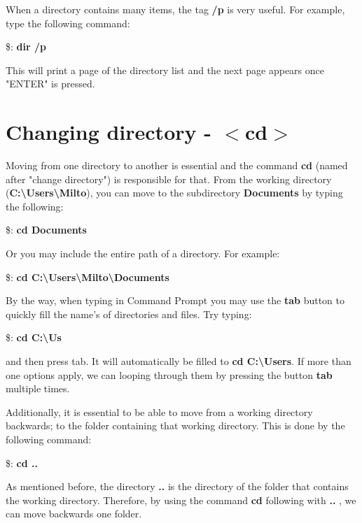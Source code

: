 \documentclass{article}
\begin{document}
	\par When a directory contains many items, the tag \textbf{/p} is very useful. For example, type the following command:
	\par\$:\textbf{ dir /p }
	
	\par This will print a page of the directory list and the next page appears once "ENTER" is pressed. 
	
		
	\section{Changing directory - $<$cd$>$}
	\par Moving from one directory to another is essential and the command \textbf{cd} (named after "change directory") is responsible for that. From the working directory (\textbf{C:\textbackslash Users\textbackslash Milto}), you can move to the subdirectory \textbf{Documents} by typing the following: 
	\par \$: \textbf{cd Documents}  
	
	\par Or you may include the entire path of a directory. For example:
	
	\par \$: \textbf{cd C:\textbackslash Users\textbackslash Milto\textbackslash Documents}  
	
	
	\par By the way, when typing in Command Prompt you may use the \textbf{tab} button to quickly fill the name's of directories and files. Try typing:
	
	\par \$: \textbf{cd C:\textbackslash Us}
	
	\par and then press tab. It will automatically be filled to \textbf{cd C:\textbackslash Users}. If more than one options apply, we can looping through them by pressing the button \textbf{tab} multiple times. 
	
	\par Additionally, it is essential to be able to move from a working directory backwards; to the folder containing that working directory. This is done by the following command:
	
	\par \$: \textbf{cd ..}
	
	\par As mentioned before, the directory \textbf{..} is the directory of the folder that contains the working directory. Therefore, by using the command \textbf{cd} following with \textbf{..} , we can move backwards one folder. 
	
\end{document}
